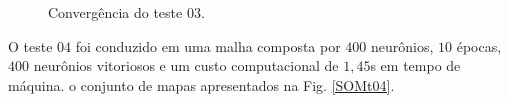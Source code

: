 \begin{figure}[H]
	\centering
	\setlength{\fboxsep}{8pt}
	\setlength{\fboxrule}{0.1pt}
	\caption{Convergência do teste $03$.}
	\label{Conv03}
\end{figure} 

O teste $04$ foi conduzido em uma malha composta por $400$ neurônios, $10$ épocas, $400$ neurônios vitoriosos e um custo computacional de $1,45$s em tempo de máquina. o conjunto de mapas apresentados na Fig. \ref{SOMt04}.

